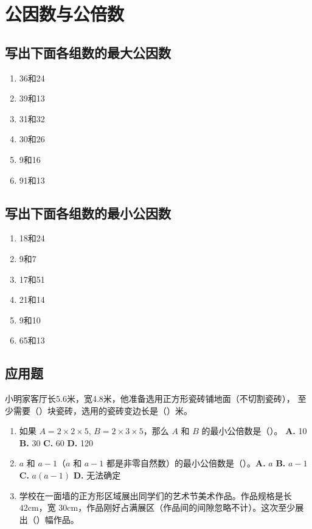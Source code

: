 \documentclass[12pt]{article}
\begin{document}
\section*{公因数与公倍数}
\subsection{写出下面各组数的最大公因数}
\begin{enumerate}
    \item 36和24
    \item 39和13
    \item 31和32
    \item 30和26
    \item 9和16
    \item 91和13
\end{enumerate}
\subsection{写出下面各组数的最小公因数}
\begin{enumerate}
    \item 18和24
    \item 9和7
    \item 17和51
    \item 21和14
    \item 9和10
    \item 65和13
\end{enumerate}
\subsection{应用题}
小明家客厅长5.6米，宽4.8米，他准备选用正方形瓷砖铺地面（不切割瓷砖），
至少需要（）块瓷砖，选用的瓷砖变边长是（）米。
\begin{enumerate}
     \item 如果 $A = 2 \times 2 \times 5$, $B = 2 \times 3 \times 5$，那么 $A$ 和 $B$ 的最小公倍数是（\quad）。 \newline \textbf{A.} 10 \quad \textbf{B.} 30 \quad \textbf{C.} 60 \quad \textbf{D.} 120 
     \item $a$ 和 $a - 1$（$a$ 和 $a - 1$ 都是非零自然数）的最小公倍数是（\quad）。\newline \textbf{A.} $a$ \quad \textbf{B.} $a - 1$ \quad \textbf{C.} $a(a - 1)$ \quad \textbf{D.} 无法确定 \item 学校在一面墙的正方形区域展出同学们的艺术节美术作品。作品规格是长 $42\text{cm}$，宽 $30\text{cm}$，作品刚好占满展区（作品间的间隙忽略不计）。这次至少展出（\quad）幅作品。 \end{enumerate}
\end{document}
